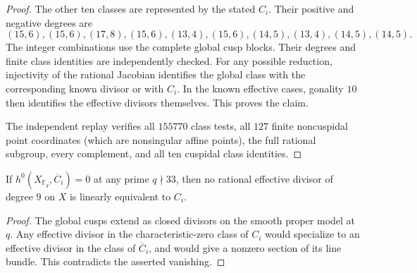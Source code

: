 \begin{proof}
The other ten classes are represented by the stated $C_i$.
Their positive and negative degrees are
\[
 (15,6),(15,6),(17,8),(15,6),(13,4),
 (15,6),(14,5),(13,4),(14,5),(14,5).
\]
The integer combinations use the complete global cusp blocks.
Their degrees and finite class identities are independently checked.
For any possible reduction, injectivity of the rational Jacobian
identifies the global class with the corresponding known divisor or
with $C_i$. In the known effective cases, gonality $10$ then
identifies the effective divisors themselves. This proves the claim.

The independent replay verifies all $155770$ class tests, all $127$
finite noncuspidal point coordinates (which are nonsingular affine
points), the full rational subgroup, every complement, and all ten
cuspidal class identities.
\end{proof}

\begin{lemma}\label{lem:nonic33-second-reduction}
If $h^0(X_{\mathbb F_q},\overline C_i)=0$ at any prime $q\nmid33$,
then no rational effective divisor of degree $9$ on $X$ is linearly
equivalent to $C_i$.
\end{lemma}
\begin{proof}
The global cusps extend as closed divisors on the smooth proper model
at $q$. Any effective divisor in the characteristic-zero class of
$C_i$ would specialize to an effective divisor in the class of
$\overline C_i$, and would give a nonzero section of its line bundle.
This contradicts the asserted vanishing.
\end{proof}

